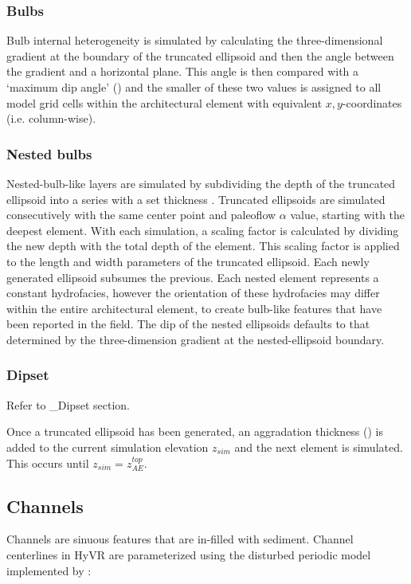 \documentclass[letterpaper,10pt,english]{sphinxmanual}
\begin{document}
\subsubsection{Bulbs}
\label{methods:bulbs}
Bulb internal heterogeneity is simulated by calculating the three-dimensional gradient at the boundary of the truncated ellipsoid and then the angle between the gradient and a horizontal plane. This angle is then compared with a `maximum dip angle' () and the smaller of these two values is assigned to all model grid cells within the architectural element with equivalent \(x,y\)-coordinates (i.e. column-wise).


\subsubsection{Nested bulbs}
\label{methods:nested-bulbs}
Nested-bulb-like layers are simulated by subdividing the depth of the truncated ellipsoid into a series with a set thickness . Truncated ellipsoids are simulated consecutively with the same center point and paleoflow \(\alpha\) value, starting with the deepest element. With each simulation, a scaling factor is calculated by dividing the new depth with the total depth of the element. This scaling factor is applied to the length and width parameters of the truncated ellipsoid. Each newly generated ellipsoid subsumes the previous. Each nested element represents a constant hydrofacies, however the orientation of these hydrofacies may differ within the entire architectural element, to create bulb-like features that have been reported in the field. The dip of the nested ellipsoids defaults to that determined by the three-dimension gradient at the nested-ellipsoid boundary.


\subsubsection{Dipset}
\label{methods:dipset}
Refer to \_Dipset section.

Once a truncated ellipsoid has been generated, an aggradation thickness () is added to the current simulation elevation \(z_{sim}\) and the next element is simulated. This occurs until \(z_{sim} = z^{top}_{AE}\).


\subsection{Channels}
\label{methods:channels}
Channels are sinuous features that are in-filled with sediment. Channel centerlines in HyVR are parameterized using the disturbed periodic model implemented by \label{methods:id5}{\hyperref[references:ferguson1976]{\sphinxcrossref{{[}Fer76{]}}}}:
\end{document}
